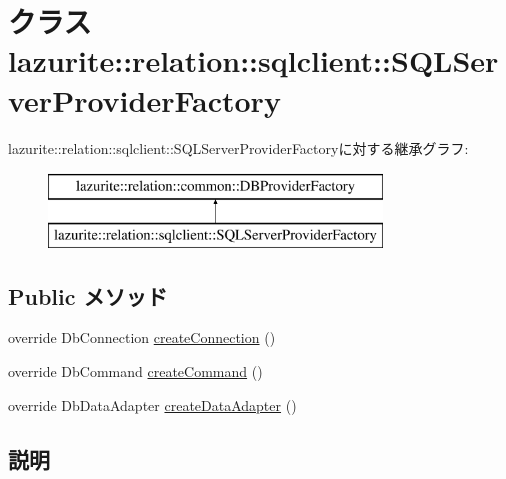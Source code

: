 \hypertarget{classlazurite_1_1relation_1_1sqlclient_1_1_s_q_l_server_provider_factory}{
\section{クラス lazurite::relation::sqlclient::SQLServerProviderFactory}
\label{classlazurite_1_1relation_1_1sqlclient_1_1_s_q_l_server_provider_factory}
}
lazurite::relation::sqlclient::SQLServerProviderFactoryに対する継承グラフ:\begin{figure}[H]
\begin{center}
\leavevmode
\includegraphics[height=2cm]{classlazurite_1_1relation_1_1sqlclient_1_1_s_q_l_server_provider_factory}
\end{center}
\end{figure}
\subsection*{Public メソッド}
\begin{DoxyCompactItemize}
\item 
override DbConnection \hyperlink{classlazurite_1_1relation_1_1sqlclient_1_1_s_q_l_server_provider_factory_aa4c5aa8059304c9ff54addb81f6bf755}{createConnection} ()
\item 
override DbCommand \hyperlink{classlazurite_1_1relation_1_1sqlclient_1_1_s_q_l_server_provider_factory_a2d33338154ebbd3abcfc8ca58aba0402}{createCommand} ()
\item 
override DbDataAdapter \hyperlink{classlazurite_1_1relation_1_1sqlclient_1_1_s_q_l_server_provider_factory_a7292de2fd61beaba65431210e7910be0}{createDataAdapter} ()
\end{DoxyCompactItemize}


\subsection{説明}


